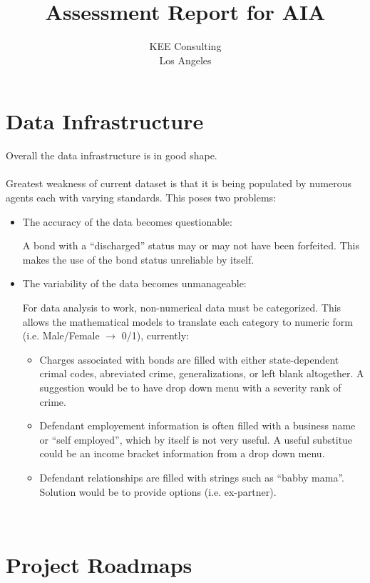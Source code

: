 \documentclass{article}
\begin{document}
\title{Assessment Report for AIA}
\author{KEE Consulting\\ 
        Los Angeles}

\maketitle



\section{Data Infrastructure}

Overall the data infrastructure is in good shape. 
~\\
~\\
Greatest weakness of current dataset is that it is being populated by numerous agents each with varying standards.  This poses two problems:

\begin{itemize}
\item The accuracy of the data becomes questionable:

A bond with a ``discharged'' status may or may not have been forfeited. This makes the use of the bond status unreliable by itself.  
 
\item The variability of the data becomes unmanageable:

For data analysis to work, non-numerical data must be categorized. This allows the mathematical models to translate each category to numeric form (i.e. Male/Female $\rightarrow$ 0/1), currently:  
\begin{itemize}
\item Charges associated with bonds are filled with either state-dependent crimal codes, abreviated crime, generalizations, or left blank altogether. A suggestion would be to have drop down menu with a severity rank of crime.  
\item Defendant employement information is often filled with a business name or ``self employed'', which by itself is not very useful. A useful substitue could be an income bracket information from a drop down menu. 
\item Defendant relationships are filled with strings such as ``babby mama''. Solution would be to provide options (i.e. ex-partner).
\end{itemize}
\end{itemize}
~\\
\section{Project Roadmaps}
\end{document}
